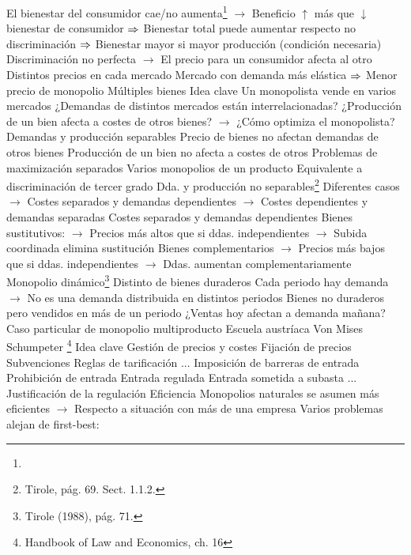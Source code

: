 \documentclass{nuevotema}
\begin{document}
\begin{esquemal}
				\4[] El bienestar del consumidor cae/no aumenta\footnote{}
				\4[] $\to$ Beneficio $\uparrow$ más que $\downarrow$ bienestar de consumidor
				\4[] $\then$ Bienestar total puede aumentar respecto no discriminación
				\4[] $\then$ Bienestar mayor si mayor producción (condición necesaria)
				\4 Discriminación no perfecta
				\4[] $\to$ El precio para un consumidor afecta al otro
				\4 Distintos precios en cada mercado
				\4[] Mercado con demanda más elástica
				\4[] $\then$ Menor precio de monopolio
		\2 Múltiples bienes
			\3 Idea clave
				\4 Un monopolista vende en varios mercados
				\4[] ¿Demandas de distintos mercados están interrelacionadas?
				\4[] ¿Producción de un bien afecta a costes de otros bienes?
				\4[] $\to$ ¿Cómo optimiza el monopolista?
			\3 Demandas y producción separables
				\4 Precio de bienes no afectan demandas de otros bienes
				\4 Producción de un bien no afecta a costes de otros
				\4[$\Rightarrow$] Problemas de maximización separados
				\4[$\Rightarrow$] Varios monopolios de un producto
				\4[$\then$] Equivalente a discriminación de tercer grado
			\3 Dda. y producción no separables\footnote{Tirole, pág. 69. Sect. 1.1.2.}
				\4 Diferentes casos
				\4[] $\to$ Costes separados y demandas dependientes
				\4[] $\to$ Costes dependientes y demandas separadas
				\4 Costes separados y demandas dependientes
				\4[] Bienes sustitutivos:
				\4[] $\to$ Precios más altos que si ddas. independientes
				\4[] $\to$ Subida coordinada elimina sustitución
				\4[] Bienes complementarios
				\4[] $\to$ Precios más bajos que si ddas. independientes
				\4[] $\to$ Ddas. aumentan complementariamente
			\3 Monopolio dinámico\footnote{Tirole (1988), pág. 71.}
				\4 Distinto de bienes duraderos
				\4[] Cada periodo hay demanda
				\4[] $\to$ No es una demanda distribuida en distintos periodos
				\4 Bienes no duraderos pero vendidos en más de un periodo
				\4 ¿Ventas hoy afectan a demanda mañana?
				\4 Caso particular de monopolio multiproducto
		\2 Escuela austríaca
			\3 Von Mises
			\3 Schumpeter
	\1 \footnote{Handbook of Law and Economics, ch. 16}
		\2 Idea clave
			\3 Gestión de precios y costes
				\4 Fijación de precios
				\4 Subvenciones
				\4 Reglas de tarificación
				\4 ...
			\3 Imposición de barreras de entrada
				\4 Prohibición de entrada
				\4 Entrada regulada
				\4 Entrada sometida a subasta
				\4 ...
		\2 Justificación de la regulación
			\3 Eficiencia
				\4 Monopolios naturales se asumen más eficientes
				\4[] $\to$ Respecto a situación con más de una empresa
				\4 Varios problemas alejan de first-best:

\end{esquemal}
\end{document}
